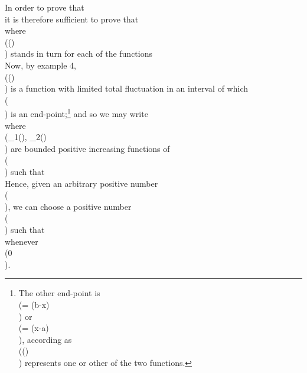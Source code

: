 In order to prove that
\\[ 
\lim_{m \rightarrow \infty}
S_{m}(x)
=
\frac{1}{2} \left\{
  f(x+0) + f(x-0)
\right\},
\\] 
it is therefore sufficient to prove that
\\[ 
\lim_{m \rightarrow \infty}
\int_{0}^{\frac{1}{2}\pi}\!
\frac{\sin (2m+1)\theta}{\sin \theta}
\phi(\theta) \, d \theta
=
0,
\\] 
where \\(\phi(\theta)\\) stands in turn for each of the functions
\\[ 
f(x+2\theta) - f(x+0),
\quad
f(x-2\theta) - f(x-0).
\\] 
Now, by  example 4, %
\\(\theta \phi(\theta) \cosec \theta\\) is a function with limited
total fluctuation in an interval of which \\(\\) is an
end-point;\footnote{The other end-point is \\(\theta =  (b-x)\\)
  or \\(\theta =  (x-a)\\), according as \\(\phi(\theta)\\)
  represents one or other of the two functions.} and so
we may write
\\[ 
\theta
\phi (\theta)
\cosec \theta
=
\chi_{1}(\theta)
-
\chi_{2}(\theta),
\\] 
where \\(\chi_{1}(\theta), \chi_{2}(\theta)\\) are bounded positive
increasing functions of \\(\theta\\) such that
\\[ 
\chi_{1}(+0) = \chi_{2}(+0) = 0.
\\] 

Hence, given an arbitrary positive number \\(\eps\\), we can choose a positive
number \\(\delta\\) such that
\\[ 
0 \leq \chi_{1}(\theta) < \eps,
\quad
0 \leq \chi_{2}(\theta) < \eps
\\] 
whenever \\(0 \leq \theta \leq {} \delta\\).

